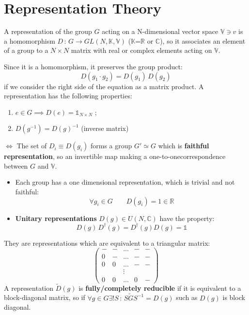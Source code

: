 \documentclass[../../main/main.tex]{subfiles}
\begin{document}
\chapter{Representation Theory}
\begin{definition}[Representation]
A representation of the group $G$ acting on a N-dimensional vector space $\mathbb{V} \owns v$ is a homomorphism $D \, : \, G \to GL(N, \mathbb{K}, \mathbb{V})$ ($\mathbb{K}$=$\mathbb{R}$ or $\mathbb{C}$), so it associates an element of a group to a $N \times N$ matrix with real or complex elements acting on $\mathbb{V}$.
\end{definition}
Since it is a homomorphism, it preserves the group product:
\begin{equation*}
D(g_1 \cdot g_2) = D(g_1) \, D(g_2)
\end{equation*}
if we consider the right side of the equation as a matrix product. \newline
A representation has the following properties:
\begin{enumerate}
\item $e \in G \implies D(e)=\mathbb{1}_{N \times N}$ ;
\item $D(g^{-1})=D(g)^{-1}$ (inverse matrix)
\end{enumerate}
$\iff$ The set of $D_{i} \equiv D(g_{i})$ forms a group $G' \simeq G$ which is \textbf{faithful representation}, so an invertible map making a one-to-onecorrespondence between $G$ and $\mathbb{V}$. \newline
\begin{itemize}
\item Each group has a one dimensional representation, which is trivial and not faithful:
\begin{equation*}
\forall g_i \in G \qquad D(g_i) = 1 \in \mathbb{R}
\end{equation*}
\item \textbf{Unitary representations} $D(g) \in U(N, \mathbb{C})$ have the property:
\begin{equation*}
D(g) \, D^{\dagger}(g) = D^{\dagger}(g) D(g) = \mathbb{1}
\end{equation*}
\end{itemize}

\begin{definition}
They are representations which are equivalent to a triangular matrix:
\begin{equation*}
\begin{pmatrix}
 - & - & ... & - & - \\
0 & - & ... & - & - \\
0 & 0 & ... & - & - \\
& & \vdots & & \\
0 & 0 & ... & 0 & -
\end{pmatrix}
\end{equation*}
A representation $\tilde{D}(g)$ is \textbf{fully/completely reducible} if it is equivalent to a block-diagonal matrix, so if $\forall g \in G \exists ! S \, : \, S\tilde{G}S^{-1}=D(g)$ such as $D(g)$ is block diagonal.
\end{definition}
\end{document}
